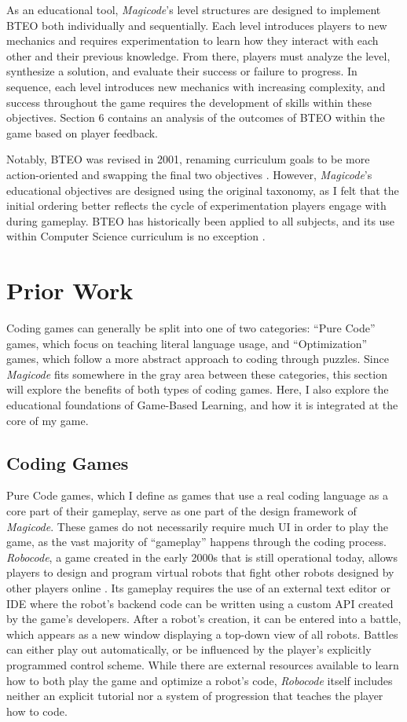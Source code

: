 \documentclass[10pt,twocolumn]{article}
\begin{document}
As an educational tool, \textit{Magicode}’s level structures are designed to implement BTEO both individually and sequentially. Each level introduces players to new mechanics and requires experimentation to learn how they interact with each other and their previous knowledge. From there, players must analyze the level, synthesize a solution, and evaluate their success or failure to progress. In sequence, each level introduces new mechanics with increasing complexity, and success throughout the game requires the development of skills within these objectives. Section 6 contains an analysis of the outcomes of BTEO within the game based on player feedback. 

Notably, BTEO was revised in 2001, renaming curriculum goals to be more action-oriented and swapping the final two objectives \cite{revised-taxonomy}. However, \textit{Magicode}’s educational objectives are designed using the original taxonomy, as I felt that the initial ordering better reflects the cycle of experimentation players engage with during gameplay. BTEO has historically been applied to all subjects, and its use within Computer Science curriculum is no exception \cite{teaching-oop}.


\section{Prior Work}
Coding games can generally be split into one of two categories: “Pure Code” games, which focus on teaching literal language usage, and “Optimization” games, which follow a more abstract approach to coding through puzzles. Since \textit{Magicode} fits somewhere in the gray area between these categories, this section will explore the benefits of both types of coding games. Here, I also explore the educational foundations of Game-Based Learning, and how it is integrated at the core of my game.

\subsection{Coding Games}
Pure Code games, which I define as games that use a real coding language as a core part of their gameplay, serve as one part of the design framework of \textit{Magicode}. These games do not necessarily require much UI in order to play the game, as the vast majority of “gameplay” happens through the coding process. \textit{Robocode}, a game created in the early 2000s that is still operational today, allows players to design and program virtual robots that fight other robots designed by other players online \cite{robocode}. Its gameplay requires the use of an external text editor or IDE where the robot’s backend code can be written using a custom API created by the game’s developers. After a robot’s creation, it can be entered into a battle, which appears as a new window displaying a top-down view of all robots. Battles can either play out automatically, or be influenced by the player’s explicitly programmed control scheme. While there are external resources available to learn how to both play the game and optimize a robot’s code, \textit{Robocode} itself includes neither an explicit tutorial nor a system of progression that teaches the player how to code.
\end{document}
